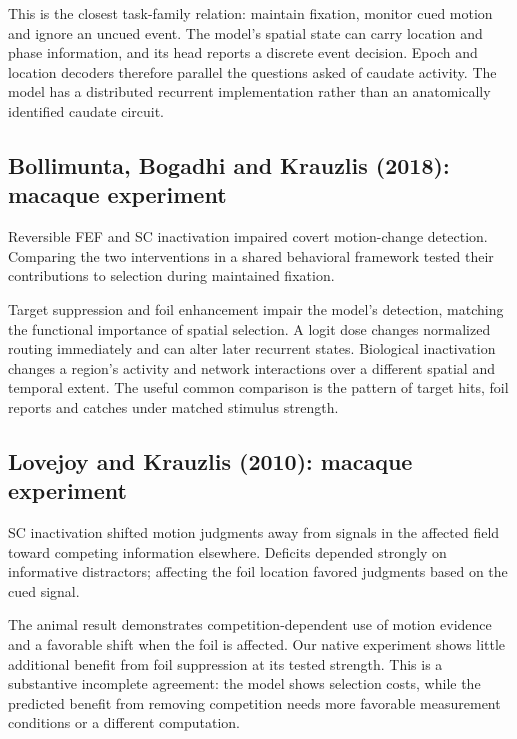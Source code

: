 \documentclass[11pt]{article}
\begin{document}
This is the closest task-family relation: maintain fixation, monitor cued motion and ignore an uncued event. The model’s spatial state can carry location and phase information, and its head reports a discrete event decision. Epoch and location decoders therefore parallel the questions asked of caudate activity. The model has a distributed recurrent implementation rather than an anatomically identified caudate circuit.

\subsection{Bollimunta, Bogadhi and Krauzlis (2018): macaque experiment}
Reversible FEF and SC inactivation impaired covert motion-change detection. Comparing the two interventions in a shared behavioral framework tested their contributions to selection during maintained fixation. \cite{bio_bollimunta}

Target suppression and foil enhancement impair the model’s detection, matching the functional importance of spatial selection. A logit dose changes normalized routing immediately and can alter later recurrent states. Biological inactivation changes a region’s activity and network interactions over a different spatial and temporal extent. The useful common comparison is the pattern of target hits, foil reports and catches under matched stimulus strength.

\subsection{Lovejoy and Krauzlis (2010): macaque experiment}
SC inactivation shifted motion judgments away from signals in the affected field toward competing information elsewhere. Deficits depended strongly on informative distractors; affecting the foil location favored judgments based on the cued signal. \cite{bio_lovejoy}

The animal result demonstrates competition-dependent use of motion evidence and a favorable shift when the foil is affected. Our native experiment shows little additional benefit from foil suppression at its tested strength. This is a substantive incomplete agreement: the model shows selection costs, while the predicted benefit from removing competition needs more favorable measurement conditions or a different computation.
\end{document}
